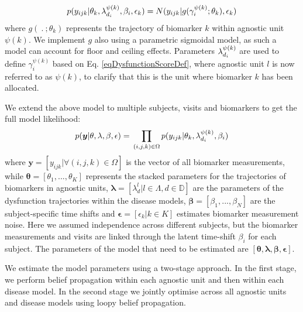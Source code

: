 \documentclass{llncs}
\begin{document}
\begin{equation}
 p(y_{ijk}|\theta_k, \lambda_{d_i}^{\psi(k)}, \beta_i, \epsilon_k) = N(y_{ijk}| g( \gamma_i^{\psi(k)} ; \theta_k), \epsilon_k)
\end{equation}
where $g(\ .\ ; \theta_k)$ represents the trajectory of biomarker $k$ within agnostic unit $\psi(k)$. We implement $g$ also using a parametric sigmoidal model, as such a model can account for floor and ceiling effects. Parameters $\lambda_{d_i}^{\psi(k)}$ are used to define $\gamma_i^{\psi(k)}$ based on Eq. \ref{eqDysfunctionScoreDef}, where agnostic unit $l$ is now referred to as $\psi(k)$, to clarify that this is the unit where biomarker $k$ has been allocated. 


We extend the above model to multiple subjects, visits and biomarkers to get the full model likelihood:
\begin{equation}
 p(\boldsymbol{y}|\theta, \lambda, \beta , \epsilon) = \\ \prod_{(i,j,k) \in \Omega} p(y_{ijk}|\theta_k, \lambda_{d_i}^{\psi(k)}, \beta_i) 
\end{equation}
where $\boldsymbol{y} = [y_{ijk} | \forall (i,j,k) \in \Omega ]$ is the vector of all biomarker measurements, while $\boldsymbol{\theta} = [\theta_1, ..., \theta_K]$ represents the stacked parameters for the trajectories of biomarkers in agnostic units, $\boldsymbol{\lambda} = [\lambda_d^{l}|l \in \Lambda, d \in \mathbb{D}]$ are the parameters of the dysfunction trajectories within the disease models, $\boldsymbol{\beta} =[\beta_1, ..., \beta_N]$ are the subject-specific time shifts and $\boldsymbol{\epsilon} = [\epsilon_k | k \in K]$  estimates biomarker measurement noise. Here we assumed independence across different subjects, but the biomarker measurements and visits are linked through the latent time-shift $\beta_i$ for each subject. The parameters of the model that need to be estimated are $[\boldsymbol{\theta}, \boldsymbol{\lambda}, \boldsymbol{\beta}, \boldsymbol{\epsilon}]$.

We estimate the model parameters using a two-stage approach. In the first stage, we perform belief propagation within each agnostic unit and then within each disease model. In the second stage we jointly optimise across all agnostic units and disease models using loopy belief propagation.
\end{document}
